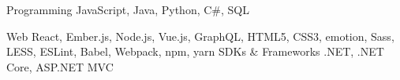 

\begin{cvskills}

  \cvskill
    {Programming} %
    {JavaScript, Java, Python, C\#, SQL} %
    
  \cvskill
    {Web} %
    {React, Ember.js, Node.js, Vue.js, GraphQL, HTML5, CSS3, emotion, Sass, LESS,  ESLint, Babel, Webpack, npm, yarn} %
  \cvskill
    {SDKs \& Frameworks} %
    {.NET, .NET Core, ASP.NET MVC} %



\end{cvskills}
